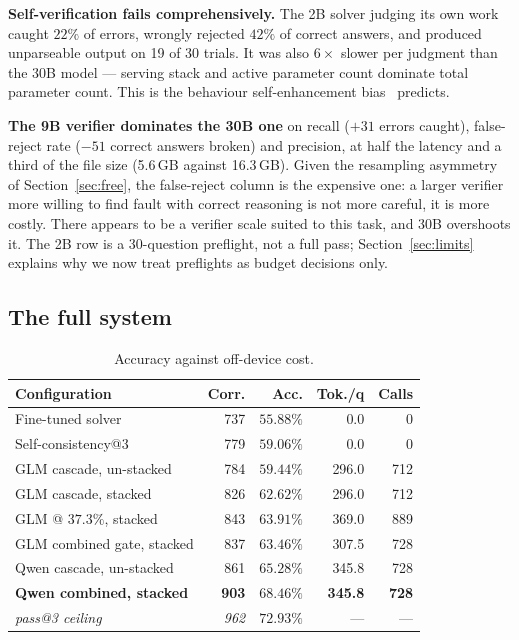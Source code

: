 \documentclass[conference]{IEEEtran}
\begin{document}
\textbf{Self-verification fails comprehensively.} The 2B solver judging its own work caught
$22\%$ of errors, wrongly rejected $42\%$ of correct answers, and produced unparseable
output on 19 of 30 trials. It was also $6\times$ slower per judgment than the 30B model ---
serving stack and active parameter count dominate total parameter count. This is the
behaviour self-enhancement bias~\cite{zheng2023judge} predicts.

\textbf{The 9B verifier dominates the 30B one} on recall ($+31$ errors caught),
false-reject rate ($-51$ correct answers broken) and precision, at half the latency and a
third of the file size (5.6\,GB against 16.3\,GB). Given the resampling asymmetry of
Section~\ref{sec:free}, the false-reject column is the expensive one: a larger verifier
more willing to find fault with correct reasoning is not more careful, it is more costly.
There appears to be a verifier scale suited to this task, and 30B overshoots it. The 2B row
is a 30-question preflight, not a full pass; Section~\ref{sec:limits} explains why we now
treat preflights as budget decisions only.

\subsection{The full system}
\label{sec:full}

\begin{table}[t]
\caption{Accuracy against off-device cost.}
\label{tab:full}
\centering
\small
\begin{tabular}{@{}lrrrr@{}}
\toprule
Configuration & Corr. & Acc. & Tok./q & Calls \\
\midrule
Fine-tuned solver & 737 & $55.88\%$ & 0.0 & 0 \\
Self-consistency@3 & 779 & $59.06\%$ & 0.0 & 0 \\
GLM cascade, un-stacked & 784 & $59.44\%$ & 296.0 & 712 \\
GLM cascade, stacked & 826 & $62.62\%$ & 296.0 & 712 \\
GLM @ $37.3\%$, stacked & 843 & $63.91\%$ & 369.0 & 889 \\
GLM combined gate, stacked & 837 & $63.46\%$ & 307.5 & 728 \\
Qwen cascade, un-stacked & 861 & $65.28\%$ & 345.8 & 728 \\
\textbf{Qwen combined, stacked} & \textbf{903} & $\mathbf{68.46\%}$ & \textbf{345.8} & \textbf{728} \\
\textit{pass@3 ceiling} & \textit{962} & \textit{$72.93\%$} & --- & --- \\
\bottomrule
\end{tabular}
\end{table}
\end{document}
